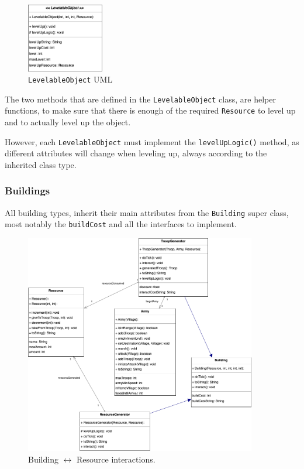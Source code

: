 \documentclass{article}
\newcommand{\code}[1]{\texttt{#1}}
\begin{document}
\begin{figure}[h]
	\vspace{1em}
	\centering
	\includegraphics[width=0.3\textwidth]{images/levelableobj.png}
	\caption{\code{LevelableObject} UML}
\end{figure}

The two methods that are defined in the \code{LevelableObject} class, are helper
functions, to make sure that there is enough of the required \code{Resource} to
level up and to actually level up the object. 

However, each \code{LevelableObject} must implement the \code{levelUpLogic()} method, as different attributes 
will change when leveling up, always according to the inherited class type.

\newpage

\subsubsection*{Buildings}

All building types, inherit their main attributes from the \code{Building} super
class, most notably the \code{buildCost} and all the interfaces to implement.

\begin{figure}[h]
	\vspace{1em}
	\centering
	\includegraphics[width=0.9\textwidth]{images/building-uml.png}
	\caption{Building $\leftrightarrow$ Resource interactions.}
\end{figure}
\end{document}
